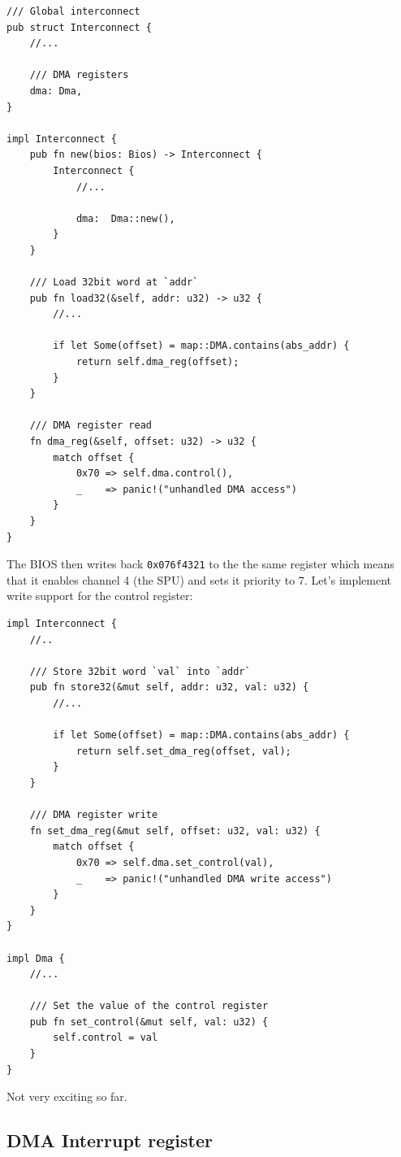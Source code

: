 \documentclass[a4paper]{article}
\newcommand{\code}[1] {\texttt{#1}}
\begin{document}
\begin{lstlisting}
/// Global interconnect
pub struct Interconnect {
    //...

    /// DMA registers
    dma: Dma,
}

impl Interconnect {
    pub fn new(bios: Bios) -> Interconnect {
        Interconnect {
            //...

            dma:  Dma::new(),
        }
    }

    /// Load 32bit word at `addr`
    pub fn load32(&self, addr: u32) -> u32 {
        //...

        if let Some(offset) = map::DMA.contains(abs_addr) {
            return self.dma_reg(offset);
        }
    }

    /// DMA register read
    fn dma_reg(&self, offset: u32) -> u32 {
        match offset {
            0x70 => self.dma.control(),
            _    => panic!("unhandled DMA access")
        }
    }
}
\end{lstlisting}

The BIOS then writes back \code{0x076f4321} to the the same register
which means that it enables channel 4 (the SPU) and sets it priority
to 7. Let's implement write support for the control register:

\begin{lstlisting}
impl Interconnect {
    //..

    /// Store 32bit word `val` into `addr`
    pub fn store32(&mut self, addr: u32, val: u32) {
        //...

        if let Some(offset) = map::DMA.contains(abs_addr) {
            return self.set_dma_reg(offset, val);
        }
    }

    /// DMA register write
    fn set_dma_reg(&mut self, offset: u32, val: u32) {
        match offset {
            0x70 => self.dma.set_control(val),
            _    => panic!("unhandled DMA write access")
        }
    }
}

impl Dma {
    //...

    /// Set the value of the control register
    pub fn set_control(&mut self, val: u32) {
        self.control = val
    }
}
\end{lstlisting}

Not very exciting so far.

\subsection{DMA Interrupt register}
\end{document}
